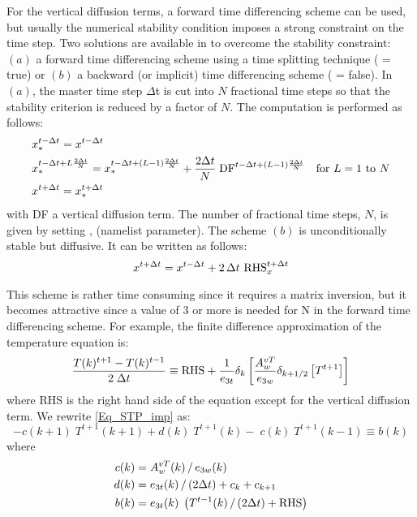 \documentclass[NEMO_book]{subfiles}
\begin{document}
For the vertical diffusion terms, a forward time differencing scheme can be 
used, but usually the numerical stability condition imposes a strong 
constraint on the time step. Two solutions are available in \NEMO to overcome 
the stability constraint: $(a)$ a forward time differencing scheme using a 
time splitting technique ( = true) or $(b)$ a backward (or implicit) 
time differencing scheme ( = false). In $(a)$, the master 
time step $\Delta $t is cut into $N$ fractional time steps so that the 
stability criterion is reduced by a factor of $N$. The computation is performed as 
follows:
\begin{equation} \label{Eq_STP_ts}
\begin{split}
& x_\ast ^{t-\Delta t} = x^{t-\Delta t}   \\
& x_\ast ^{t-\Delta t+L\frac{2\Delta t}{N}}=x_\ast ^{t-\Delta t+\left( {L-1} 
\right)\frac{2\Delta t}{N}}+\frac{2\Delta t}{N}\;\text{DF}^{t-\Delta t+\left( {L-1} \right)\frac{2\Delta t}{N}}
        \quad \text{for $L=1$ to $N$}      \\
& x^{t+\Delta t} = x_\ast^{t+\Delta t}
\end{split}
\end{equation}
with DF a vertical diffusion term. The number of fractional time steps, $N$, is given 
by setting , (namelist parameter). The scheme $(b)$ is unconditionally 
stable but diffusive. It can be written as follows:
\begin{equation} \label{Eq_STP_imp}
   x^{t+\Delta t} = x^{t-\Delta t} + 2 \, \Delta t \  \text{RHS}_x^{t+\Delta t}
\end{equation} 

This scheme is rather time consuming since it requires a matrix inversion, 
but it becomes attractive since a value of 3 or more is needed for N in
the forward time differencing scheme. For example, the finite difference 
approximation of the temperature equation is:
\begin{equation} \label{Eq_STP_imp_zdf}
\frac{T(k)^{t+1}-T(k)^{t-1}}{2\;\Delta t}\equiv \text{RHS}+\frac{1}{e_{3t} }\delta 
_k \left[ {\frac{A_w^{vT} }{e_{3w} }\delta _{k+1/2} \left[ {T^{t+1}} \right]} 
\right]
\end{equation}
where RHS is the right hand side of the equation except for the vertical diffusion term. 
We rewrite \eqref{Eq_STP_imp} as:
\begin{equation} \label{Eq_STP_imp_mat}
-c(k+1)\;T^{t+1}(k+1) + d(k)\;T^{t+1}(k) - \;c(k)\;T^{t+1}(k-1) \equiv b(k)
\end{equation}
where 
\begin{align*} 
 c(k) &= A_w^{vT} (k) \, / \, e_{3w} (k)     \\
 d(k) &= e_{3t} (k)       \, / \, (2\Delta t) + c_k + c_{k+1}    \\
 b(k) &= e_{3t} (k) \; \left( T^{t-1}(k) \, / \, (2\Delta t) + \text{RHS} \right)    
\end{align*}
\end{document}
